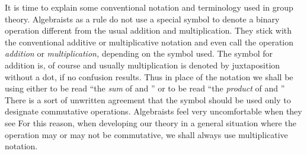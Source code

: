 \documentclass[11pt,oneside]{article}
\begin{document}
\fi
\renewcommand{\BookFooter}{Section 4 Nonabelian Examples}
\ifdefined\BookMaster\else\setcounter{page}{39}\fi
\BookNarrativetrue

\begin{BookBody}



\noindent It is time to explain some conventional notation and terminology used in group theory. Algebraists as a rule do not use a special symbol \BookInline{\ast } to denote a binary operation different from the usual addition and multiplication. They stick with the conventional additive or multiplicative notation and even call the operation\textit{ addition} or\textit{ multiplication,} depending 
on the symbol used. The symbol for addition is, of course\BookInline{,\allowbreak +,\allowbreak } and usually multiplication is denoted by juxtaposition without a dot, if no confusion results. Thus in place of the notation  we shall be using either  to be read “the\textit{ sum} of  and ” or  to be read “the\textit{ product} of  and ” There is a sort of unwritten agreement that the symbol \BookInline{+ } should be used only to designate commutative operations. Algebraists feel very uncomfortable when they see  For this reason, when developing our theory in a general situation where the operation may or may not be commutative, we shall always use multiplicative notation.

\end{BookBody}

\BookNarrativetrue
\end{document}
